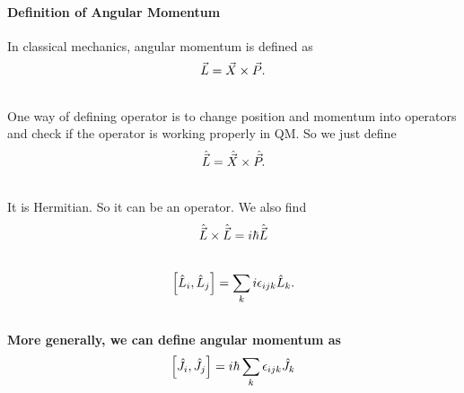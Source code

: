\documentclass[letterpaper,10pt,english]{sphinxmanual}
\begin{document}
\paragraph{Definition of Angular Momentum}
\label{QuantumMechanics2:definition-of-angular-momentum}
In classical mechanics, angular momentum is defined as
\begin{gather}
\begin{split}\vec L = \vec X \times \vec P .\end{split}\notag\\\begin{split}\end{split}\notag
\end{gather}
One way of defining operator is to change position and momentum into operators and check if the operator is working properly in QM. So we just define
\begin{gather}
\begin{split}\hat {\vec L} = \hat {\vec X}\times \hat{\vec P}.\end{split}\notag\\\begin{split}\end{split}\notag
\end{gather}
It is Hermitian. So it can be an operator. We also find
\begin{gather}
\begin{split}\hat{\vec L}\times \hat{\vec L} = i \hbar \hat{\vec L}\end{split}\notag\\\begin{split}\end{split}\notag
\end{gather}\begin{gather}
\begin{split}\left[\hat L_i,\hat L_j\right] = \sum_k i\epsilon_{ijk}\hat L_k    .\end{split}\notag\\\begin{split}\end{split}\notag
\end{gather}
\textbf{More generally, we can define angular momentum as}
\begin{gather}
\begin{split}\left[\hat J_i, \hat J_j\right] = i\hbar \sum_k \epsilon_{ijk} \hat J_k\end{split}\notag\\\begin{split}\end{split}\notag
\end{gather}
\end{document}
